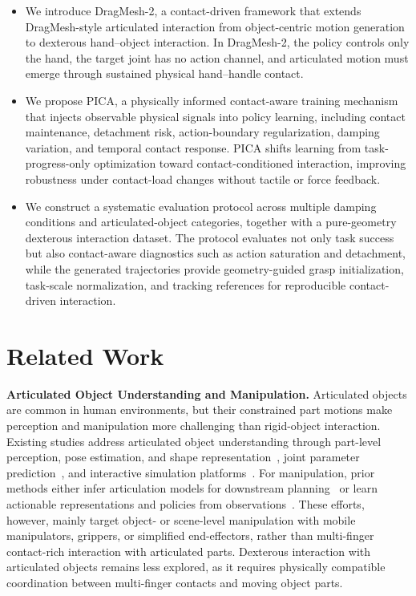 \documentclass{llmxive}
\begin{document}
\begin{itemize}[leftmargin=1.2em]

\item We introduce DragMesh-2, a contact-driven framework that extends DragMesh-style articulated interaction from object-centric motion generation to dexterous hand--object interaction. In DragMesh-2, the policy controls only the hand, the target joint has no action channel, and articulated motion must emerge through sustained physical hand--handle contact.

\item  We propose PICA, a physically informed contact-aware training mechanism that injects observable physical signals into policy learning, including contact maintenance, detachment risk, action-boundary regularization, damping variation, and temporal contact response. PICA shifts learning from task-progress-only optimization toward contact-conditioned interaction, improving robustness under contact-load changes without tactile or force feedback.

\item We construct a systematic evaluation protocol across multiple damping conditions and articulated-object categories, together with a pure-geometry dexterous interaction dataset. The protocol evaluates not only task success but also contact-aware diagnostics such as action saturation and detachment, while the generated trajectories provide geometry-guided grasp initialization, task-scale normalization, and tracking references for reproducible contact-driven interaction.
    
\end{itemize}


\section{Related Work}

\textbf{Articulated Object Understanding and Manipulation.}
Articulated objects are common in human environments, but their constrained part motions make perception and manipulation more challenging than rigid-object interaction. Existing studies address articulated object understanding through part-level perception, pose estimation, and shape representation~\cite{geng2023gapartnet,li2020category,mu2021sdf,zhang2026dicart}, joint parameter prediction~\cite{wang2019shape2motion,jain2021screwnet,jiang2022ditto}, and interactive simulation platforms~\cite{makoviychuk2021isaac,xiang2020sapien}. For manipulation, prior methods either infer articulation models for downstream planning~\cite{buchanan2026online} or learn actionable representations and policies from observations~\cite{mo2021where2act,xu2022umpnet,eisner2022flowbot3d}. These efforts, however, mainly target object- or scene-level manipulation with mobile manipulators, grippers, or simplified end-effectors, rather than multi-finger contact-rich interaction with articulated parts. Dexterous interaction with articulated objects remains less explored, as it requires physically compatible coordination between multi-finger contacts and moving object parts.
\end{document}
